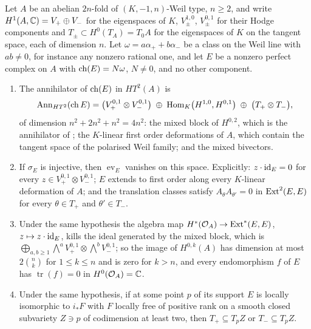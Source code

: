 \begin{theorem}
\label{thm:p2forces}
Let $A$ be an abelian $2n$-fold of $(K,-1,n)$-Weil type, $n\ge2$, and write
$H^{1}(A,\mathbb{C})=V_{+}\oplus V_{-}$ for the eigenspaces of $K$,
$V_{\pm}^{1,0}$, $V_{\pm}^{0,1}$ for their Hodge components and
$T_{\pm}\subset H^{0}(T_{A})=T_{0}A$ for the eigenspaces of $K$ on the tangent
space, each of dimension $n$. Let $\omega=a\alpha_{+}+b\alpha_{-}$ be a
class on the Weil line with $ab\ne0$, for instance any nonzero rational one,
and let $E$ be a nonzero perfect complex on $A$ with $\operatorname{ch}(E)=N\omega$,
$N\ne0$, and no other component.
\begin{enumerate}[label=\textup{(\roman*)},leftmargin=2.6em,itemsep=2pt]
\item The annihilator of $\operatorname{ch}(E)$ in $HT^{2}(A)$ is
  \[
    \operatorname{Ann}_{HT^{2}}(\operatorname{ch} E)
    =\bigl(V_{+}^{0,1}\otimes V_{-}^{0,1}\bigr)
    \;\oplus\;\operatorname{Hom}_{K}\bigl(H^{1,0},H^{0,1}\bigr)
    \;\oplus\;\bigl(T_{+}\otimes T_{-}\bigr),
  \]
  of dimension $n^{2}+2n^{2}+n^{2}=4n^{2}$: the mixed block of $H^{0,2}$,
  which is the annihilator of \cite[Lemma~9.6]{paperI}; the $K$-linear first
  order deformations of $A$, which contain the tangent space of the polarised
  Weil family; and the mixed bivectors.
\item If $\sigma_{E}$ is injective, then $\operatorname{ev}_{E}$ vanishes on
  this space. Explicitly: $z\cdot\operatorname{id}_{E}=0$ for every $z\in V_{+}^{0,1}\otimes
  V_{-}^{0,1}$; $E$ extends to first order along every $K$-linear deformation
  of $A$; and the translation classes satisfy $A_{\theta}A_{\theta'}=0$ in
  $\operatorname{Ext}^{2}(E,E)$ for every $\theta\in T_{+}$ and $\theta'\in T_{-}$.
\item Under the same hypothesis the algebra map $H^{*}(\mathcal{O}_{A})\to\operatorname{Ext}^{*}(E,E)$,
  $z\mapsto z\cdot\operatorname{id}_{E}$, kills the ideal generated by the mixed block,
  which is $\bigoplus_{a,b\ge1}\bigwedge^{a}V_{+}^{0,1}\otimes\bigwedge^{b}V_{-}^{0,1}$;
  so the image of $H^{0,k}(A)$ has dimension at most $2\binom{n}{k}$ for
  $1\le k\le n$ and is zero for $k>n$, and every endomorphism $f$ of $E$ has
  $\operatorname{tr}(f)=0$ in $H^{0}(\mathcal{O}_{A})=\mathbb{C}$.
\item Under the same hypothesis, if at some point $p$ of its support $E$ is
  locally isomorphic to $i_{*}F$ with $F$ locally free of positive rank on a
  smooth closed subvariety $Z\ni p$ of codimension at least two, then
  $T_{+}\subseteq T_{p}Z$ or $T_{-}\subseteq T_{p}Z$.
\end{enumerate}
\end{theorem}

